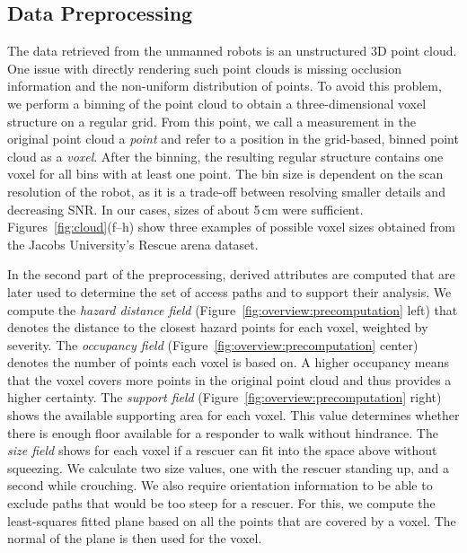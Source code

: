 \documentclass[conference,10pt,letter]{IEEEtran}
\begin{document}
\subsection{Data Preprocessing} \label{sec:overview:preprocessing}
The data retrieved from the unmanned robots is an unstructured 3D point cloud. One issue with directly rendering such point clouds is missing occlusion information and the non-uniform distribution of points. To avoid this problem, we perform a binning of the point cloud to obtain a three-dimensional voxel structure on a regular grid. From this point, we call a measurement in the original point cloud a \emph{point} and refer to a position in the grid-based, binned point cloud as a \emph{voxel}. After the binning, the resulting regular structure contains one voxel for all bins with at least one point. The bin size is dependent on the scan resolution of the robot, as it is a trade-off between resolving smaller details and decreasing SNR. In our cases, sizes of about 5\,cm were sufficient. Figures~\ref{fig:cloud}(f--h) show three examples of possible voxel sizes obtained from the Jacobs University's Rescue arena dataset.

In the second part of the preprocessing, derived attributes are computed that are later used to determine the set of access paths and to support their analysis. We compute the \emph{hazard distance field} (Figure~\ref{fig:overview:precomputation} left) that denotes the distance to the closest hazard points for each voxel, weighted by severity. The \emph{occupancy field} (Figure~\ref{fig:overview:precomputation} center) denotes the number of points each voxel is based on. A higher occupancy means that the voxel covers more points in the original point cloud and thus provides a higher certainty. The \emph{support field} (Figure~\ref{fig:overview:precomputation} right) shows the available supporting area for each voxel. This value determines whether there is enough floor available for a responder to walk without hindrance. The \emph{size field} shows for each voxel if a rescuer can fit into the space above without squeezing. We calculate two size values, one with the rescuer standing up, and a second while crouching. We also require orientation information to be able to exclude paths that would be too steep for a rescuer. For this, we compute the least-squares fitted plane based on all the points that are covered by a voxel. The normal of the plane is then used for the voxel.
\end{document}
